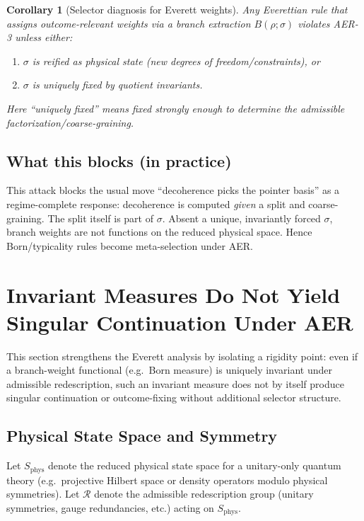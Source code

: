 \documentclass[11pt]{article}
\newtheorem{corollary}[definition]{Corollary}
\theoremstyle{remark}
\theoremstyle{plain}
\begin{document}
\begin{corollary}[Selector diagnosis for Everett weights]
Any Everettian rule that assigns outcome-relevant weights via a branch extraction $B(\rho;\sigma)$
violates AER-3 unless either:
\begin{enumerate}
\item $\sigma$ is reified as physical state (new degrees of freedom/constraints), or
\item $\sigma$ is uniquely fixed by quotient invariants.
\end{enumerate}
Here ``uniquely fixed'' means fixed strongly enough to determine the admissible factorization/coarse-graining.
\end{corollary}

\subsection{What this blocks (in practice)}

This attack blocks the usual move ``decoherence picks the pointer basis'' as a regime-complete response:
decoherence is computed \emph{given} a split and coarse-graining. The split itself is part of $\sigma$.
Absent a unique, invariantly forced $\sigma$, branch weights are not functions on the reduced physical space.
Hence Born/typicality rules become meta-selection under AER.




\section{Invariant Measures Do Not Yield Singular Continuation Under AER}
\label{sec:everett-invariant}

This section strengthens the Everett analysis by isolating a rigidity point:
even if a branch-weight functional (e.g.\ Born measure) is uniquely invariant
under admissible redescription, such an invariant measure does not by itself
produce singular continuation or outcome-fixing without additional selector structure.

\subsection{Physical State Space and Symmetry}

Let $S_{\mathrm{phys}}$ denote the reduced physical state space for a unitary-only
quantum theory (e.g.\ projective Hilbert space or density operators modulo physical symmetries).
Let $\mathcal{R}$ denote the admissible redescription group (unitary symmetries,
gauge redundancies, etc.) acting on $S_{\mathrm{phys}}$.
\end{document}
